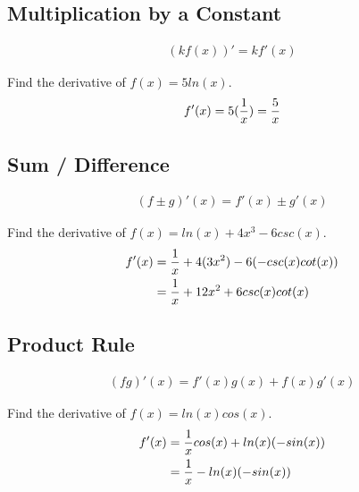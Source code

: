 \subsection{Multiplication by a Constant}

\begin{theorem}
    \begin{align}
        (kf(x))' = kf'(x)
    \end{align}
\end{theorem}

\begin{exercise}\nonumber
    Find the derivative of $ f(x) = 5ln(x) $. \\

    $$
        f'(x) = 5({1 \over x}) = {5 \over x}
    $$
\end{exercise}

\subsection{Sum / Difference}

\begin{theorem}
    \begin{align}
        (f \pm g)'(x) = f'(x) \pm g'(x)
    \end{align}
\end{theorem}

\begin{exercise}\nonumber
    Find the derivative of $ f(x) = ln(x) + 4x^3 - 6csc(x) $. \\

    \begin{align}
        f'(x) & = {1 \over x} + 4(3x^2) - 6(-csc(x)cot(x)) \\
              & = {1 \over x} + 12x^2 + 6csc(x)cot(x)
    \end{align}
\end{exercise}

\subsection{Product Rule}

\begin{theorem}
    \begin{align}
        (fg)'(x) = f'(x)g(x) + f(x)g'(x)
    \end{align}
\end{theorem}

\begin{exercise}\nonumber
    Find the derivative of $ f(x) = ln(x)cos(x) $. \\

    \begin{align}
        f'(x) & = {1 \over x}cos(x) + ln(x)(-sin(x)) \\
              & = {1 \over x} - ln(x)(-sin(x))
    \end{align}
\end{exercise}

